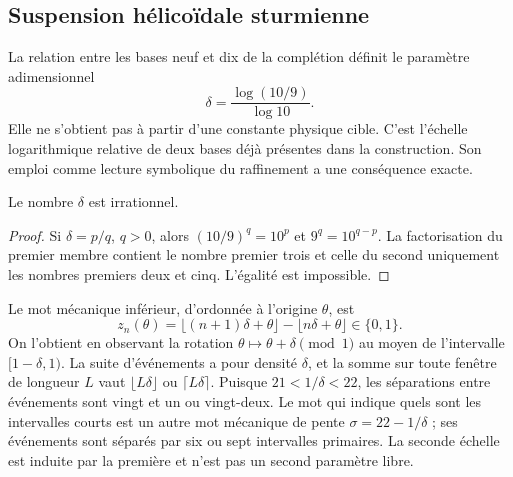 \subsection{Suspension hélicoïdale sturmienne}

La relation entre les bases neuf et dix de la complétion définit le paramètre adimensionnel
\begin{equation}
 \delta=\frac{\log(10/9)}{\log10}.
 \label{eq:delta-sturm}
\end{equation}
Elle ne s'obtient pas à partir d'une constante physique cible. C'est l'échelle logarithmique relative de deux bases déjà présentes dans la construction. Son emploi comme lecture symbolique du raffinement a une conséquence exacte.

\begin{lemma}
Le nombre \(\delta\) est irrationnel.
\end{lemma}
\begin{proof}
Si \(\delta=p/q\), \(q>0\), alors \((10/9)^q=10^p\) et \(9^q=10^{q-p}\). La factorisation du premier membre contient le nombre premier trois et celle du second uniquement les nombres premiers deux et cinq. L'égalité est impossible.
\end{proof}

Le mot mécanique inférieur, d'ordonnée à l'origine \(\theta\), est
\[
 z_n(\theta)=\lfloor(n+1)\delta+\theta\rfloor-\lfloor n\delta+\theta\rfloor\in\{0,1\}.
\]
On l'obtient en observant la rotation \(\theta\mapsto\theta+\delta\pmod1\) au moyen de l'intervalle \([1-\delta,1)\). La suite d'événements a pour densité \(\delta\), et la somme sur toute fenêtre de longueur \(L\) vaut \(\lfloor L\delta\rfloor\) ou \(\lceil L\delta\rceil\). Puisque \(21<1/\delta<22\), les séparations entre événements sont vingt et un ou vingt-deux. Le mot qui indique quels sont les intervalles courts est un autre mot mécanique de pente \(\sigma=22-1/\delta\) ; ses événements sont séparés par six ou sept intervalles primaires. La seconde échelle est induite par la première et n'est pas un second paramètre libre.



